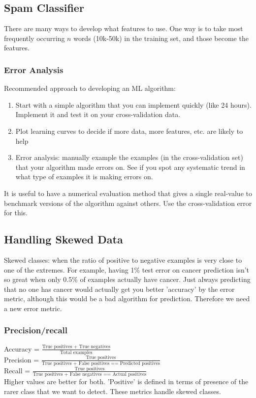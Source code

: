 \documentclass[11pt,letterpaper]{article}
\begin{document}
\subsection{Spam Classifier}
There are many ways to develop what features to use. One way is to take most frequently occurring $n$ words (10k-50k) in the training set, and those become the features. 
\subsubsection{Error Analysis}
Recommended approach to developing an ML algorithm:
\begin{enumerate}
	\item Start with a simple algorithm that you can implement quickly (like 24 hours). Implement it and test it on your cross-validation data.
	\item Plot learning curves to decide if more data, more features, etc. are likely to help
	\item Error analysis: manually example the examples (in the cross-validation set) that your algorithm made errors on. See if you spot any systematic trend in what type of examples it is making errors on.
\end{enumerate}
It is useful to have a numerical evaluation method that gives a single real-value to benchmark versions of the algorithm against others. Use the cross-validation error for this.
\subsection{Handling Skewed Data}
Skewed classes: when the ratio of positive to negative examples is very close to one of the extremes. For example, having 1\% test error on cancer prediction isn't so great when only 0.5\% of examples actually have cancer. Just always predicting that no one has cancer would actually get you better 'accuracy' by the error metric, although this would be a bad algorithm for prediction. Therefore we need a new error metric.
\subsubsection{Precision/recall}
Accuracy = $\frac{\textrm{True positives + True negatives}}{\textrm{Total examples}}$\\
Precision = $\frac{\textrm{True positives}}{\textrm{True positives + False positives == Predicted positives}}$\\
Recall = $\frac{\textrm{True positives}}{\textrm{True positives + False negatives == Actual positives}}$\\
Higher values are better for both. 'Positive' is defined in terms of presence of the rarer class that we want to detect. These metrics handle skewed classes.
\end{document}
